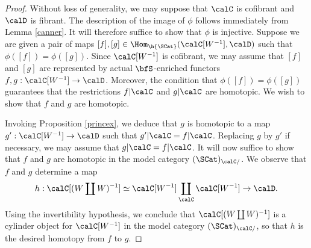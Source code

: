 \begin{proof}
Without loss of generality, we may suppose that $\calC$ is cofibrant and $\calD$ is fibrant.
The description of the image of $\phi$ follows immediately from Lemma \ref{canner}.
It will therefore suffice to show that $\phi$ is injective. Suppose we are given a pair of maps
$[f], [g] \in \Hom_{ \h{\SCat}}( \calC[W^{-1}], \calD)$ such that $\phi( [f] ) = \phi( [g] )$. Since
$\calC[ W^{-1}]$ is cofibrant, we may assume that $[f]$ and $[g]$ are represented by
actual $\bfS$-enriched functors $f,g: \calC[W^{-1}] \rightarrow \calD$. Moreover, the
condition that $\phi( [f] ) = \phi( [g] )$ guarantees that the restrictions
$f|\calC$ and $g|\calC$ are homotopic. We wish to show that $f$ and $g$ are homotopic.

Invoking Proposition \ref{princex}, we deduce that $g$ is homotopic to a map
$g': \calC[W^{-1}] \rightarrow \calD$ such that $g' | \calC = f | \calC$. Replacing $g$ by
$g'$ if necessary, we may assume that $g| \calC = f| \calC$. It will now suffice to show that
$f$ and $g$ are homotopic in the model category $( \SCat)_{\calC/}$. We
observe that $f$ and $g$ determine a map
$$ h: \calC[ ( W \coprod W)^{-1} ] \simeq \calC[W^{-1}] \coprod_{\calC} \calC[W^{-1}] \rightarrow \calD.$$
Using the invertibility hypothesis, we conclude that
$\calC[ (W \coprod W)^{-1}]$ is a cylinder object for
$\calC[W^{-1}]$ in the model category $( \SCat)_{\calC/}$, so that $h$ is the desired
homotopy from $f$ to $g$. 
\end{proof}

